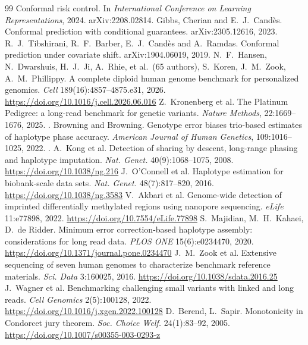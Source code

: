 \begin{thebibliography}{99}
\newblock Conformal risk control.
\newblock In \emph{International Conference on Learning Representations}, 2024.
\newblock arXiv:2208.02814.
Gibbs, Cherian and E.~J.~Cand\`es.
\newblock Conformal prediction with conditional guarantees.
\newblock arXiv:2305.12616, 2023.
R.~J.~Tibshirani, R.~F.~Barber, E.~J.~Cand\`es and A.~Ramdas.
\newblock Conformal prediction under covariate shift.
\newblock arXiv:1904.06019, 2019.
 N.~F.~Hansen, N.~Dwarshuis, H.~J.~Ji, A.~Rhie, et al.\ (65 authors), S.~Koren, J.~M.~Zook, A.~M.~Phillippy. A complete diploid human genome benchmark for personalized genomics. \emph{Cell} 189(16):4857--4875.e31, 2026. \url{https://doi.org/10.1016/j.cell.2026.06.016}
Z.~Kronenberg et al.
\newblock The Platinum Pedigree: a long-read benchmark for genetic variants.
\newblock \emph{Nature Methods}, 22:1669--1676, 2025.
\newblock {}.
Browning and Browning.
\newblock Genotype error biases trio-based estimates of haplotype phase
accuracy.
\newblock \emph{American Journal of Human Genetics}, 109:1016--1025, 2022.
\newblock {}.
 A.~Kong et al. Detection of sharing by descent, long-range phasing and haplotype imputation. \emph{Nat. Genet.} 40(9):1068--1075, 2008. \url{https://doi.org/10.1038/ng.216}
 J.~O'Connell et al. Haplotype estimation for biobank-scale data sets. \emph{Nat. Genet.} 48(7):817--820, 2016. \url{https://doi.org/10.1038/ng.3583}
 V.~Akbari et al. Genome-wide detection of imprinted differentially methylated regions using nanopore sequencing. \emph{eLife} 11:e77898, 2022. \url{https://doi.org/10.7554/eLife.77898}
 S.~Majidian, M.~H.~Kahaei, D.~de Ridder. Minimum error correction-based haplotype assembly: considerations for long read data. \emph{PLOS ONE} 15(6):e0234470, 2020. \url{https://doi.org/10.1371/journal.pone.0234470}
 J.~M.~Zook et al. Extensive sequencing of seven human genomes to characterize benchmark reference materials. \emph{Sci. Data} 3:160025, 2016. \url{https://doi.org/10.1038/sdata.2016.25}
 J.~Wagner et al. Benchmarking challenging small variants with linked and long reads. \emph{Cell Genomics} 2(5):100128, 2022. \url{https://doi.org/10.1016/j.xgen.2022.100128}
 D.~Berend, L.~Sapir. Monotonicity in Condorcet jury theorem. \emph{Soc. Choice Welf.} 24(1):83--92, 2005. \url{https://doi.org/10.1007/s00355-003-0293-z}
\end{thebibliography}
